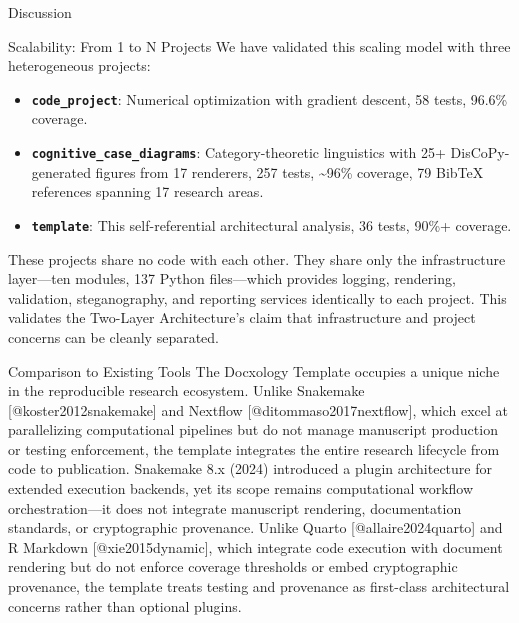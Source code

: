 \documentclass[
  ignorenonframetext,
]{beamer}
\providecommand{\tightlist}{%
  \setlength{\itemsep}{0pt}\setlength{\parskip}{0pt}}
\begin{document}
\begin{frame}[fragile]{Discussion}
\begin{block}{Scalability: From 1 to N Projects}
We have validated this scaling model with three heterogeneous projects:

\begin{itemize}
\tightlist
\item
  \textbf{\texttt{code\_project}}: Numerical optimization with gradient
  descent, 58 tests, 96.6\% coverage.
\item
  \textbf{\texttt{cognitive\_case\_diagrams}}: Category-theoretic
  linguistics with 25+ DisCoPy-generated figures from 17 renderers, 257
  tests, \textasciitilde96\% coverage, 79 BibTeX references spanning 17
  research areas.
\item
  \textbf{\texttt{template}}: This self-referential architectural
  analysis, 36 tests, 90\%+ coverage.
\end{itemize}

These projects share no code with each other. They share only the
infrastructure layer---ten modules, 137 Python files---which provides
logging, rendering, validation, steganography, and reporting services
identically to each project. This validates the Two-Layer Architecture's
claim that infrastructure and project concerns can be cleanly separated.
\end{block}

\begin{block}{Comparison to Existing Tools}
\protect{}\label{comparison-to-existing-tools}
The Docxology Template occupies a unique niche in the reproducible
research ecosystem. Unlike Snakemake {[}@koster2012snakemake{]} and
Nextflow {[}@ditommaso2017nextflow{]}, which excel at parallelizing
computational pipelines but do not manage manuscript production or
testing enforcement, the template integrates the entire research
lifecycle from code to publication. Snakemake 8.x (2024) introduced a
plugin architecture for extended execution backends, yet its scope
remains computational workflow orchestration---it does not integrate
manuscript rendering, documentation standards, or cryptographic
provenance. Unlike Quarto {[}@allaire2024quarto{]} and R Markdown
{[}@xie2015dynamic{]}, which integrate code execution with document
rendering but do not enforce coverage thresholds or embed cryptographic
provenance, the template treats testing and provenance as first-class
architectural concerns rather than optional plugins.


\end{block}
\end{frame}
\end{document}
